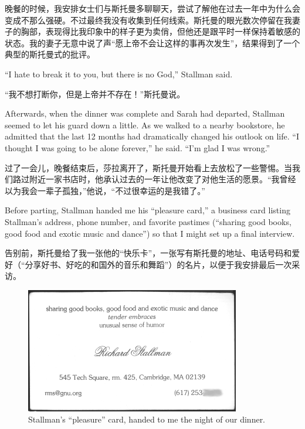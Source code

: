 \ifdefined\chs
晚餐的时候，我安排女士们与斯托曼多聊聊天，尝试了解他在过去一年中为什么会变成不那么强硬。不过最终我没有收集到任何线索。斯托曼的眼光数次停留在我妻子的胸部，表现得比我印象中的样子更为卖俏，但他还是跟平时一样保持着敏感的状态。我的妻子无意中说了声``愿上帝不会让这样的事再次发生''，结果得到了一个典型的斯托曼式的批评。
\fi

\ifdefined\eng
``I hate to break it to you, but there is no God,'' Stallman said. %
\fi

\ifdefined\chs
``我不想打断你，但是上帝并不存在！''斯托曼说。%
\fi

\ifdefined\eng
Afterwards, when the dinner was complete and Sarah had departed, Stallman seemed to let his guard down a little. As we walked to a nearby bookstore, he admitted that the last 12 months had dramatically changed his outlook on life. ``I thought I was going to be alone forever,'' he said. ``I'm glad I was wrong.''
\fi

\ifdefined\chs
过了一会儿，晚餐结束后，莎拉离开了，斯托曼开始看上去放松了一些警惕。当我们路过附近一家书店时，他承认过去的一年让他改变了对他生活的愿景。``我曾经以为我会一辈子孤独，''他说，``不过很幸运的是我错了。''
\fi

\ifdefined\eng
Before parting, Stallman handed me his ``pleasure card,'' a business card listing Stallman's address, phone number, and favorite pastimes (``sharing good books, good food and exotic music and dance'') so that I might set up a final interview.
\fi

\ifdefined\chs
告别前，斯托曼给了我一张他的``快乐卡''，一张写有斯托曼的地址、电话号码和爱好（``分享好书、好吃的和国外的音乐和舞蹈''）的名片，以便于我安排最后一次采访。
\fi

\ifdefined\eng
\begin{figure}[ht] \centering
  \includegraphics[width=\textwidth]{pleasurecard}
  \caption{Stallman's ``pleasure'' card, handed to me the night of our dinner.}
\end{figure}
\fi

